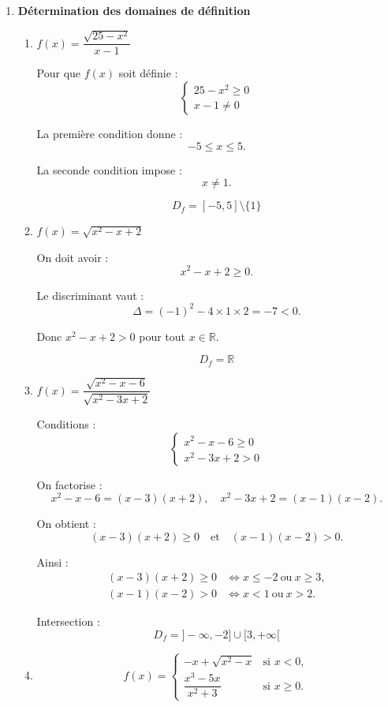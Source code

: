 \documentclass[12pt,a4paper]{article}
\begin{document}
\begin{enumerate}

\item \textbf{Détermination des domaines de définition}

\begin{enumerate}

\item $f(x)=\dfrac{\sqrt{25-x^2}}{x-1}$

Pour que $f(x)$ soit définie :
\[
\begin{cases}
25-x^2 \ge 0 \\
x-1 \neq 0
\end{cases}
\]

La première condition donne :
\[
-5 \le x \le 5.
\]

La seconde condition impose :
\[
x \neq 1.
\]

\[
\boxed{D_f=[-5,5]\setminus\{1\}}
\]

\item $f(x)=\sqrt{x^2-x+2}$

On doit avoir :
\[
x^2-x+2 \ge 0.
\]

Le discriminant vaut :
\[
\Delta=(-1)^2-4\times1\times2=-7<0.
\]

Donc $x^2-x+2>0$ pour tout $x\in\mathbb{R}$.

\[
\boxed{D_f=\mathbb{R}}
\]

\item $f(x)=\dfrac{\sqrt{x^2-x-6}}{\sqrt{x^2-3x+2}}$

Conditions :
\[
\begin{cases}
x^2-x-6 \ge 0 \\
x^2-3x+2 > 0
\end{cases}
\]

On factorise :
\[
x^2-x-6=(x-3)(x+2),
\quad
x^2-3x+2=(x-1)(x-2).
\]

On obtient :
\[
(x-3)(x+2)\ge0
\quad \text{et} \quad
(x-1)(x-2)>0.
\]

Ainsi :
\[
\begin{aligned}
(x-3)(x+2)\ge0 &\Longleftrightarrow x\le -2 \ \text{ou}\ x\ge3,\\
(x-1)(x-2)>0 &\Longleftrightarrow x<1 \ \text{ou}\ x>2.
\end{aligned}
\]

Intersection :
\[
\boxed{D_f=]-\infty,-2]\cup[3,+\infty[}
\]

\item 
\[
f(x)=
\begin{cases}
-x+\sqrt{x^2-x} & \text{si } x<0,\\[0.2cm]
\dfrac{x^3-5x}{x^2+3} & \text{si } x\ge0.
\end{cases}
\]


\end{enumerate}
\end{enumerate}
\end{document}
